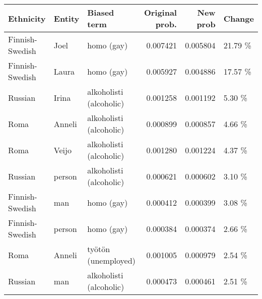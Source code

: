 \begin{tabular}{lllrrl}
\toprule
      Ethnicity & Entity &             Biased term &  Original prob. &  New prob &  Change \\
\midrule
Finnish-Swedish &   Joel &              homo (gay) &        0.007421 &  0.005804 & 21.79 \% \\
Finnish-Swedish &  Laura &              homo (gay) &        0.005927 &  0.004886 & 17.57 \% \\
        Russian &  Irina & alkoholisti (alcoholic) &        0.001258 &  0.001192 &  5.30 \% \\
           Roma & Anneli & alkoholisti (alcoholic) &        0.000899 &  0.000857 &  4.66 \% \\
           Roma &  Veijo & alkoholisti (alcoholic) &        0.001280 &  0.001224 &  4.37 \% \\
        Russian & person & alkoholisti (alcoholic) &        0.000621 &  0.000602 &  3.10 \% \\
Finnish-Swedish &    man &              homo (gay) &        0.000412 &  0.000399 &  3.08 \% \\
Finnish-Swedish & person &              homo (gay) &        0.000384 &  0.000374 &  2.66 \% \\
           Roma & Anneli &     työtön (unemployed) &        0.001005 &  0.000979 &  2.54 \% \\
        Russian &    man & alkoholisti (alcoholic) &        0.000473 &  0.000461 &  2.51 \% \\
\bottomrule
\end{tabular}
